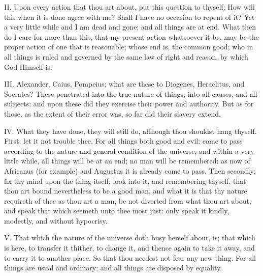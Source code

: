 II. Upon every action that thou art about, put this question to thyself;
How will this when it is done agree with me? Shall I have no occasion to
repent of it? Yet a very little while and I am dead and gone; and all
things are at end. What then do I care for more than this, that my present
action whatsoever it be, may be the proper action of one that is
reasonable; whose end is, the common good; who in all things is ruled and
governed by the same law of right and reason, by which God Himself is.

III. Alexander, Caius, Pompeius; what are these to Diogenes, Heraclitus,
and Socrates? These penetrated into the true nature of things; into all
causes, and all subjects: and upon these did they exercise their power and
authority. But as for those, as the extent of their error was, so far did
their slavery extend.

IV. What they have done, they will still do, although thou shouldst hang
thyself. First; let it not trouble thee. For all things both good and
evil: come to pass according to the nature and general condition of the
universe, and within a very little while, all things will be at an end; no
man will be remembered: as now of Africanus (for example) and Augustus it
is already come to pass. Then secondly; fix thy mind upon the thing
itself; look into it, and remembering thyself, that thou art bound
nevertheless to be a good man, and what it is that thy nature requireth of
thee as thou art a man, be not diverted from what thou art about, and
speak that which seemeth unto thee most just: only speak it kindly,
modestly, and without hypocrisy.

V. That which the nature of the universe doth busy herself about, is;
that which is here, to transfer it thither, to change it, and thence again
to take it away, and to carry it to another place. So that thou needest
not fear any new thing. For all things are usual and ordinary; and all
things are disposed by equality.

